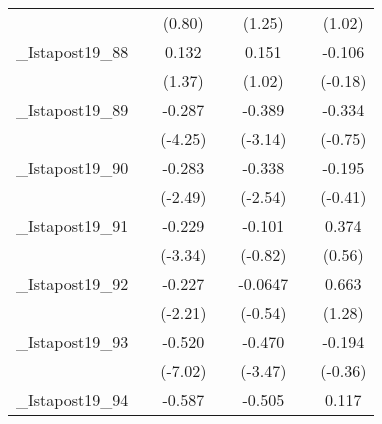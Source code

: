 {\begin{tabular}{l*{6}{c}}
            &                     &      (0.80)         &                     &      (1.25)         &                     &      (1.02)         \\
[1em]
\_Istapost19\_88&                     &       0.132         &                     &       0.151         &                     &      -0.106         \\
            &                     &      (1.37)         &                     &      (1.02)         &                     &     (-0.18)         \\
[1em]
\_Istapost19\_89&                     &      -0.287\sym{***}&                     &      -0.389\sym{**} &                     &      -0.334         \\
            &                     &     (-4.25)         &                     &     (-3.14)         &                     &     (-0.75)         \\
[1em]
\_Istapost19\_90&                     &      -0.283\sym{*}  &                     &      -0.338\sym{*}  &                     &      -0.195         \\
            &                     &     (-2.49)         &                     &     (-2.54)         &                     &     (-0.41)         \\
[1em]
\_Istapost19\_91&                     &      -0.229\sym{**} &                     &      -0.101         &                     &       0.374         \\
            &                     &     (-3.34)         &                     &     (-0.82)         &                     &      (0.56)         \\
[1em]
\_Istapost19\_92&                     &      -0.227\sym{*}  &                     &     -0.0647         &                     &       0.663         \\
            &                     &     (-2.21)         &                     &     (-0.54)         &                     &      (1.28)         \\
[1em]
\_Istapost19\_93&                     &      -0.520\sym{***}&                     &      -0.470\sym{**} &                     &      -0.194         \\
            &                     &     (-7.02)         &                     &     (-3.47)         &                     &     (-0.36)         \\
[1em]
\_Istapost19\_94&                     &      -0.587\sym{***}&                     &      -0.505\sym{***}&                     &       0.117         \\

\end{tabular}}
